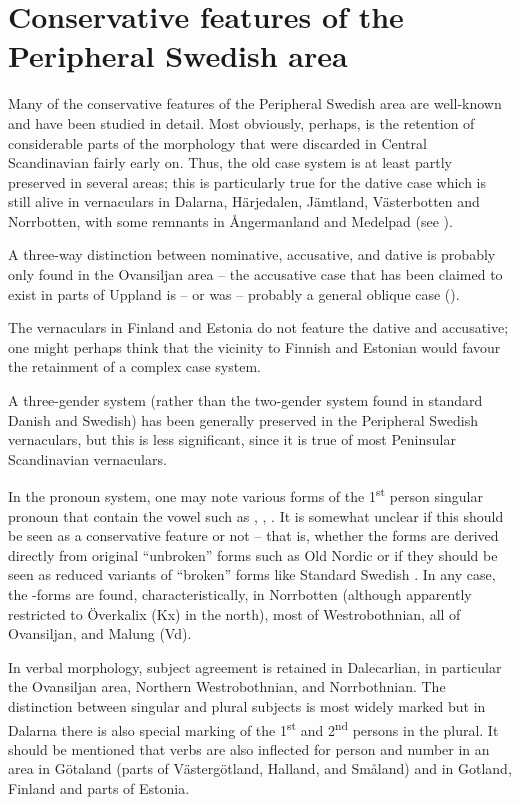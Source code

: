 \section{Conservative features of the Peripheral Swedish area}

Many of the conservative features of the Peripheral Swedish area are well-known and have been studied in detail. Most obviously, perhaps, is the retention of considerable parts of the morphology that were discarded in Central Scandinavian fairly early on. Thus, the old case system is at least partly preserved in several areas; this is particularly true for the dative case which is still alive in vernaculars in Dalarna, Härjedalen, Jämtland, Västerbotten and Norrbotten, with some remnants in Ångermanland and Medelpad (see ). 

A three-way distinction between nominative, accusative, and dative is probably only found in the Ovansiljan area – the accusative case that has been claimed to exist in parts of Uppland is – or was – probably a general oblique case (\citealt{DahlEtAl2006}). 

The vernaculars in Finland and Estonia do not feature the dative and accusative; one might perhaps think that the vicinity to Finnish and Estonian would favour the retainment of a complex case system. 

A three-gender system (rather than the two-gender system found in standard Danish and Swedish) has been generally preserved in the Peripheral Swedish vernaculars, but this is less significant, since it is true of most Peninsular Scandinavian vernaculars. 

In the pronoun system, one may note various forms of the 1\textsuperscript{st} person singular pronoun that contain the vowel such as , , . It is somewhat unclear if this should be seen as a conservative feature or not – that is, whether the forms are derived directly from original “unbroken” forms such as Old Nordic or if they should be seen as reduced variants of “broken” forms like Standard Swedish . In any case, the -forms are found, characteristically, in Norrbotten (although apparently restricted to Överkalix (Kx) in the north), most of Westrobothnian, all of Ovansiljan, and Malung (Vd). 

In verbal morphology, subject agreement is retained in Dalecarlian, in particular the Ovansiljan area, Northern Westrobothnian, and Norrbothnian. The distinction between singular and plural subjects is most widely marked but in Dalarna there is also special marking of the 1\textsuperscript{st} and 2\textsuperscript{nd} persons in the plural. It should be mentioned that verbs are also inflected for person and number in an area in Götaland (parts of Västergötland, Halland, and Småland) and in Gotland, Finland and parts of Estonia.

